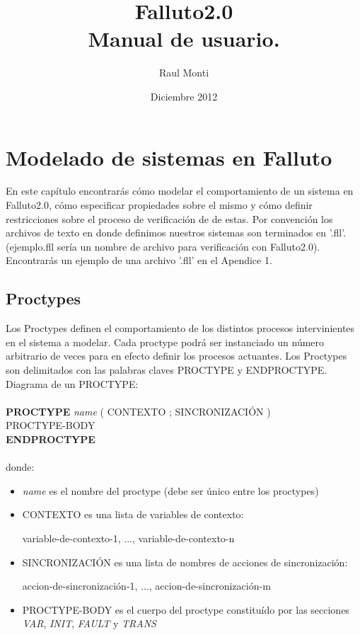 \documentclass[titlepage, 12pt]{book}
\title{Falluto2.0 \\ Manual de usuario.}
\author{Raul Monti}
\date{Diciembre 2012}
\begin{document}
\maketitle

\newpage
\tableofcontents

\chapter{Modelado de sistemas en Falluto}
En este cap\'itulo encontrar\'as c\'omo modelar el comportamiento de un sistema en Falluto2.0, c\'omo especificar propiedades sobre el mismo y c\'omo definir restricciones sobre el proceso de verificaci\'on de de estas.
Por convenci\'on los archivos de texto en donde definimos nuestros sistemas son terminados en '.fll'. (ejemplo.fll ser\'ia un nombre de archivo para verificaci\'on con Falluto2.0).\\
\indent Encontrar\'as un ejemplo de una archivo '.fll' en el Apendice 1.

\section{Proctypes}
Los Proctypes definen el comportamiento de los distintos procesos intervinientes en el sistema a modelar. Cada proctype podr\'a ser instanciado un n\'umero arbitrario de veces para en efecto definir los procesos actuantes.
Los Proctypes son delimitados con las palabras claves PROCTYPE y ENDPROCTYPE.
Diagrama de un PROCTYPE:\\\\
\textbf{PROCTYPE} \textit{name} ( CONTEXTO ; SINCRONIZACI\'ON )\\
\indent PROCTYPE-BODY\\
\textbf{ENDPROCTYPE}\\\\
donde:\\
\begin{itemize}
\item \emph{name} es el nombre del proctype (debe ser \'unico entre los proctypes)\\
\item CONTEXTO es una lista de variables de contexto:
\begin{center} variable-de-contexto-1, ..., variable-de-contexto-n\\ \end{center}
\item SINCRONIZACI\'ON es una lista de nombres de acciones de sincronizaci\'on:
\begin{center} accion-de-sincronizaci\'on-1, ..., accion-de-sincronizaci\'on-m\\ \end{center}
\item PROCTYPE-BODY es el cuerpo del proctype constitu\'ido por las secciones \emph{VAR}, \emph{INIT}, \emph{FAULT} y \emph{TRANS}
\end{itemize}
\end{document}

